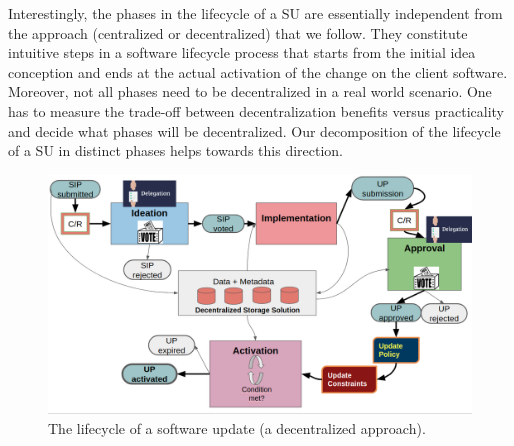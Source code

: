 Interestingly, the phases in the lifecycle of a SU are essentially independent 
from the approach (centralized or decentralized) that we follow. They 
constitute intuitive steps in a software lifecycle process that starts from the 
initial idea conception and ends at the actual activation of the change on the 
client software. 
Moreover, not all phases need to be decentralized in a real world scenario. One 
has to measure the trade-off between decentralization benefits versus 
practicality and decide what phases will be decentralized. Our decomposition of 
the lifecycle of a SU in distinct phases helps towards this direction.


\begin{figure}[h!] %
	\centering
	\includegraphics[width=0.8\columnwidth,
	keepaspectratio]{figures/software_update_lifecycle.png}
	\caption{The lifecycle of a software update (a decentralized approach).}
	\label{fig:dsu_lifecycle}
\end{figure}


